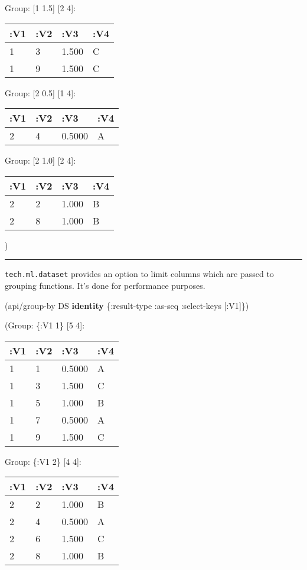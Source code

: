 \documentclass[]{article}
\newenvironment{Shaded}{\begin{snugshade}}{\end{snugshade}}
\newcommand{\KeywordTok}[1]{\textcolor[rgb]{0.13,0.29,0.53}{\textbf{#1}}}
\newcommand{\AttributeTok}[1]{\textcolor[rgb]{0.77,0.63,0.00}{#1}}
\newcommand{\NormalTok}[1]{#1}
\begin{document}
Group: {[}1 1.5{]} {[}2 4{]}:

\begin{longtable}[]{@{}llll@{}}
\toprule
:V1 & :V2 & :V3 & :V4\tabularnewline
\midrule
\endhead
1 & 3 & 1.500 & C\tabularnewline
1 & 9 & 1.500 & C\tabularnewline
\bottomrule
\end{longtable}

Group: {[}2 0.5{]} {[}1 4{]}:

\begin{longtable}[]{@{}llll@{}}
\toprule
:V1 & :V2 & :V3 & :V4\tabularnewline
\midrule
\endhead
2 & 4 & 0.5000 & A\tabularnewline
\bottomrule
\end{longtable}

Group: {[}2 1.0{]} {[}2 4{]}:

\begin{longtable}[]{@{}llll@{}}
\toprule
:V1 & :V2 & :V3 & :V4\tabularnewline
\midrule
\endhead
2 & 2 & 1.000 & B\tabularnewline
2 & 8 & 1.000 & B\tabularnewline
\bottomrule
\end{longtable}

)

\begin{center}\rule{0.5\linewidth}{0.5pt}\end{center}

\texttt{tech.ml.dataset} provides an option to limit columns which are
passed to grouping functions. It's done for performance purposes.

\begin{Shaded}
\begin{Highlighting}[]
\NormalTok{(api/group-by DS }\KeywordTok{identity}\NormalTok{ \{}\AttributeTok{:result-type} \AttributeTok{:as-seq}
                           \AttributeTok{:select-keys}\NormalTok{ [}\AttributeTok{:V1}\NormalTok{]\})}
\end{Highlighting}
\end{Shaded}

(Group: \{:V1 1\} {[}5 4{]}:

\begin{longtable}[]{@{}llll@{}}
\toprule
:V1 & :V2 & :V3 & :V4\tabularnewline
\midrule
\endhead
1 & 1 & 0.5000 & A\tabularnewline
1 & 3 & 1.500 & C\tabularnewline
1 & 5 & 1.000 & B\tabularnewline
1 & 7 & 0.5000 & A\tabularnewline
1 & 9 & 1.500 & C\tabularnewline
\bottomrule
\end{longtable}

Group: \{:V1 2\} {[}4 4{]}:

\begin{longtable}[]{@{}llll@{}}
\toprule
:V1 & :V2 & :V3 & :V4\tabularnewline
\midrule
\endhead
2 & 2 & 1.000 & B\tabularnewline
2 & 4 & 0.5000 & A\tabularnewline
2 & 6 & 1.500 & C\tabularnewline
2 & 8 & 1.000 & B\tabularnewline
\bottomrule
\end{longtable}
\end{document}
